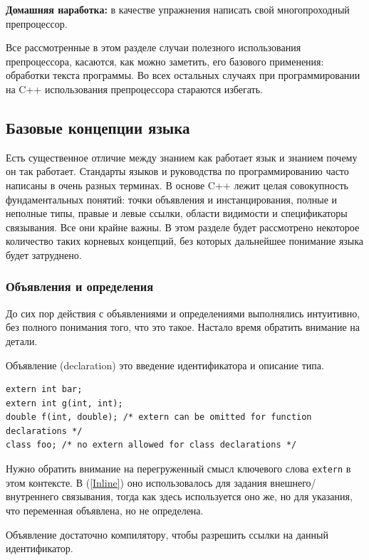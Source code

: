 \documentclass[a4paper,12pt,oneside]{article}
\begin{document}
\textbf{Домашняя наработка:} в качестве упражнения написать свой многопроходный препроцессор. 

Все рассмотренные в этом разделе случаи полезного использования препроцессора, касаются, как можно заметить, его базового применения: обработки текста программы. Во всех остальных случаях при программировании на C++ использования препроцессора стараются избегать.

\pagebreak
\subsection{Базовые концепции языка}\label{BasicTerms}

Есть существенное отличие между знанием как работает язык и знанием почему он так работает. Стандарты языков и руководства по программированию часто написаны в очень разных терминах. В основе C++ лежит целая совокупность фундаментальных понятий: точки объявления и инстанцирования, полные и неполные типы, правые и левые ссылки, области видимости и спецификаторы связывания. Все они крайне важны. В этом разделе будет рассмотрено некоторое количество таких корневых концепций, без которых дальнейшее понимание языка будет затруднено.

\subsubsection{Объявления и определения}\label{DeclVsDef}

До сих пор действия с объявлениями и определениями выполнялись интуитивно, без полного понимания того, что это такое. Настало время обратить внимание на детали.

Объявление (declaration) это введение идентификатора и описание типа.

\begin{lstlisting}
extern int bar;
extern int g(int, int);
double f(int, double); /* extern can be omitted for function declarations */
class foo; /* no extern allowed for class declarations */
\end{lstlisting}

Нужно обратить внимание на перегруженный смысл ключевого слова \lstinline!extern! в этом контексте. В (\ref{Inline}) оно использовалось для задания внешнего/внутреннего связывания, тогда как здесь используется оно же, но для указания, что переменная объявлена, но не определена.

Объявление достаточно компилятору, чтобы разрешить ссылки на данный идентификатор. 
\end{document}

